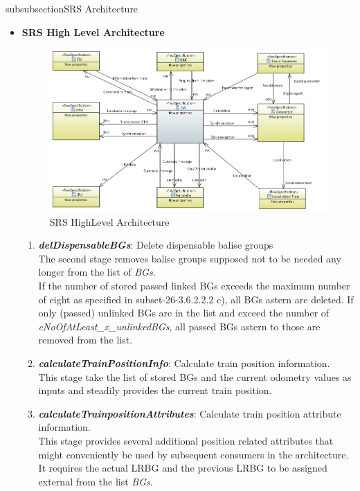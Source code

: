 subsubsection{SRS Architecture}\label{sss:calctrainpos}

\begin{itemize}
\item \textbf{SRS High Level Architecture}\\


\begin{figure}[hbtp]
\centering
\includegraphics[scale=1]{../images/HighLevelArchitecture.png}
\caption{SRS HighLevel Architecture}
\end{figure}


\begin{enumerate}



\item \textbf{\textit{delDispensableBGs}}: Delete dispensable balise groups\\
The second stage removes balise groups supposed not to be needed any longer from the list of \textit{BGs}.\\
If the number of stored passed linked BGs exceeds the maximum number of eight as specified in subset-26-3.6.2.2.2 c), all BGs astern are deleted.
If only (passed) unlinked BGs are in the list and exceed the number of \textit{cNoOfAtLeast\_x\_unlinkedBGs}, all passed BGs astern to those are removed from the list. 

\item \textbf{\textit{calculateTrainPositionInfo}}: Calculate train position information.\\
This stage take the list of stored BGs and the current odometry values as inputs and steadily provides the current train position. 

\item \textbf{\textit{calculateTrainpositionAttributes}}: Calculate train position attribute information.\\
This stage provides several additional position related attributes that might conveniently be used by subsequent consumers in the architecture. It requires the actual LRBG and the previous LRBG to be assigned external from the list \textit{BGs}. 

\end{enumerate}


\end{itemize}

